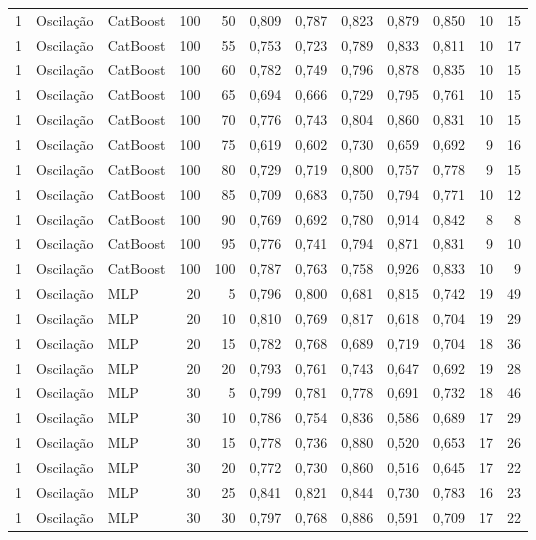\begin{longtable}{@{}rllrrrrrrrrr@{}}
1 & Oscilação & CatBoost & 100 & 50 & 0,809 & 0,787 & 0,823 & 0,879 & 0,850 & 10 & 15 \\
1 & Oscilação & CatBoost & 100 & 55 & 0,753 & 0,723 & 0,789 & 0,833 & 0,811 & 10 & 17 \\
1 & Oscilação & CatBoost & 100 & 60 & 0,782 & 0,749 & 0,796 & 0,878 & 0,835 & 10 & 15 \\
1 & Oscilação & CatBoost & 100 & 65 & 0,694 & 0,666 & 0,729 & 0,795 & 0,761 & 10 & 15 \\
1 & Oscilação & CatBoost & 100 & 70 & 0,776 & 0,743 & 0,804 & 0,860 & 0,831 & 10 & 15 \\
1 & Oscilação & CatBoost & 100 & 75 & 0,619 & 0,602 & 0,730 & 0,659 & 0,692 & 9 & 16 \\
1 & Oscilação & CatBoost & 100 & 80 & 0,729 & 0,719 & 0,800 & 0,757 & 0,778 & 9 & 15 \\
1 & Oscilação & CatBoost & 100 & 85 & 0,709 & 0,683 & 0,750 & 0,794 & 0,771 & 10 & 12 \\
1 & Oscilação & CatBoost & 100 & 90 & 0,769 & 0,692 & 0,780 & 0,914 & 0,842 & 8 & 8 \\
1 & Oscilação & CatBoost & 100 & 95 & 0,776 & 0,741 & 0,794 & 0,871 & 0,831 & 9 & 10 \\
1 & Oscilação & CatBoost & 100 & 100 & 0,787 & 0,763 & 0,758 & 0,926 & 0,833 & 10 & 9 \\
1 & Oscilação & MLP & 20 & 5 & 0,796 & 0,800 & 0,681 & 0,815 & 0,742 & 19 & 49 \\
1 & Oscilação & MLP & 20 & 10 & 0,810 & 0,769 & 0,817 & 0,618 & 0,704 & 19 & 29 \\
1 & Oscilação & MLP & 20 & 15 & 0,782 & 0,768 & 0,689 & 0,719 & 0,704 & 18 & 36 \\
1 & Oscilação & MLP & 20 & 20 & 0,793 & 0,761 & 0,743 & 0,647 & 0,692 & 19 & 28 \\
1 & Oscilação & MLP & 30 & 5 & 0,799 & 0,781 & 0,778 & 0,691 & 0,732 & 18 & 46 \\
1 & Oscilação & MLP & 30 & 10 & 0,786 & 0,754 & 0,836 & 0,586 & 0,689 & 17 & 29 \\
1 & Oscilação & MLP & 30 & 15 & 0,778 & 0,736 & 0,880 & 0,520 & 0,653 & 17 & 26 \\
1 & Oscilação & MLP & 30 & 20 & 0,772 & 0,730 & 0,860 & 0,516 & 0,645 & 17 & 22 \\
1 & Oscilação & MLP & 30 & 25 & 0,841 & 0,821 & 0,844 & 0,730 & 0,783 & 16 & 23 \\
1 & Oscilação & MLP & 30 & 30 & 0,797 & 0,768 & 0,886 & 0,591 & 0,709 & 17 & 22 \\

\end{longtable}
